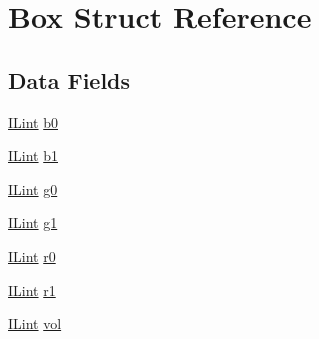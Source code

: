 \hypertarget{struct_box}{\section{Box Struct Reference}
\label{struct_box}
}
\subsection*{Data Fields}
\begin{DoxyCompactItemize}
\item 
\hyperlink{il_8h_a288a97fb9e92e707a60b749d0039fafe}{I\-Lint} \hyperlink{struct_box_ac1dc5f6d02f50c776c0fba71efc4a650}{b0}
\item 
\hyperlink{il_8h_a288a97fb9e92e707a60b749d0039fafe}{I\-Lint} \hyperlink{struct_box_a36415d264aaec3c5e9e924ca7b2ba381}{b1}
\item 
\hyperlink{il_8h_a288a97fb9e92e707a60b749d0039fafe}{I\-Lint} \hyperlink{struct_box_a362f13530ace2415e961b9dfa6f6d109}{g0}
\item 
\hyperlink{il_8h_a288a97fb9e92e707a60b749d0039fafe}{I\-Lint} \hyperlink{struct_box_a16c0da73057f4e03164e87b298e6a78f}{g1}
\item 
\hyperlink{il_8h_a288a97fb9e92e707a60b749d0039fafe}{I\-Lint} \hyperlink{struct_box_af63ccc2b282f14259f7e6dc1ed56e80f}{r0}
\item 
\hyperlink{il_8h_a288a97fb9e92e707a60b749d0039fafe}{I\-Lint} \hyperlink{struct_box_ad8e3855e48612f60e080c24c97bd0039}{r1}
\item 
\hyperlink{il_8h_a288a97fb9e92e707a60b749d0039fafe}{I\-Lint} \hyperlink{struct_box_a2d37aaf53616f8526c571cefa4555013}{vol}
\end{DoxyCompactItemize}


